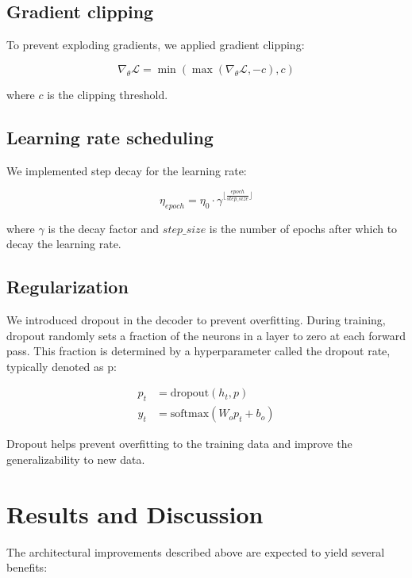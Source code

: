 \documentclass{article}
\theoremstyle{plain}
\theoremstyle{definition}
\theoremstyle{remark}
\begin{document}
\subsection{Gradient clipping} To prevent exploding gradients, we applied gradient clipping:
    
\begin{equation}
\nabla_{\theta} \mathcal{L} = \min \left( \max \left( \nabla_{\theta} \mathcal{L}, -c \right), c \right)
\end{equation}

where $c$ is the clipping threshold.
    
\subsection{Learning rate scheduling} We implemented step decay for the learning rate:
    
\begin{equation}
\eta_{epoch} = \eta_{0} \cdot \gamma^{\lfloor \frac{epoch}{step\_size} \rfloor}
\end{equation}

where $\gamma$ is the decay factor and $step\_size$ is the number of epochs after which to decay the learning rate.

\subsection{Regularization} We introduced dropout in the decoder to prevent overfitting. During training, dropout randomly sets a fraction of the neurons in a layer to zero at each forward pass. This fraction is determined by a hyperparameter called the dropout rate, typically denoted as p:
    
\begin{align}
p_t &= \text{dropout}(h_t, p) \\
y_t &= \text{softmax}(W_o p_t + b_o)
\end{align}

Dropout helps prevent overfitting to the training data and improve the generalizability to new data. 


\section{Results and Discussion}


The architectural improvements described above are expected to yield several benefits:
\end{document}
